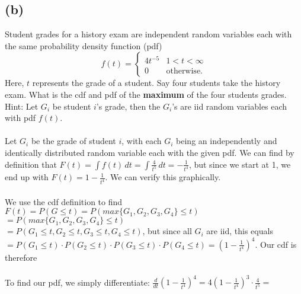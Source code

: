 \documentclass{article}
\begin{document}
{\subsection*{(b)}
Student grades for a history exam are independent random variables each with the same probability density function (pdf)
\[f(t)=\begin{cases}4t^{-5}& 1<t<\infty\\ 0& \text{otherwise.}  \end{cases}\]
Here, $t$ represents the grade of a student.  Say four students  take  the history exam. What is the cdf and pdf  of the {\bf{maximum}} of the four students grades. Hint: Let $G_i$ be student $i$'s grade, then the  $G_i$'s are iid random variables each with pdf $f(t)$. \\ \\ 
Let $G_i$ be the grade of student $i$, with each $G_i$ being an independently and identically distributed random variable each with the given pdf. We can find by definition that $F(t) = \int f(t) \, dt = \int \frac{4}{t^5} \, dt = -\frac{1}{t^4}$, but since we start at 1, we end up with $F(t) = 1 - \frac{1}{t^4}$. We can verify this graphically. \\ \\
We use the cdf definition to find $F(t) = P(G \leq t) = P(max\{G_1, G_2, G_3, G_4\} \leq t) $ \\ 
$ = P(max\{G_1, G_2, G_3, G_4\} \leq t)$ \\
$= P(G_1 \leq t, G_2 \leq t, G_3 \leq t, G_4 \leq t)$, but since all $G_i$ are iid, this equals \\
$= P(G_1 \leq t) \cdot P(G_2 \leq t) \cdot P(G_3 \leq t) \cdot P(G_4 \leq t) = (1-\frac{1}{t^4})^4$. Our cdf is therefore  \\ \\
To find our pdf, we simply differentiate: $\frac{d}{dt} (1-\frac{1}{t^4})^4 = 4(1 - \frac{1}{t^4})^3 \cdot \frac{4}{t^5} = $   \\ 

}
\end{document}
